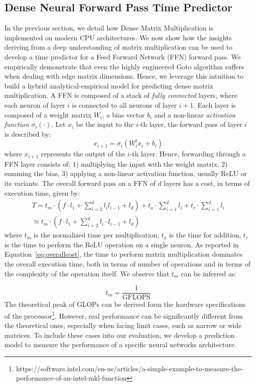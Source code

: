 \subsection{Dense Neural Forward Pass Time Predictor}
\label{subsec:densetimepred}
In the previous section, we detail how Dense Matrix Multiplication is implemented on modern CPU architectures. We now show how the insights deriving from a deep understanding of matrix multiplication can be used to develop a time predictor for a Feed Forward Network (FFN) forward pass. We empirically demonstrate that even the highly engineered Goto algorithm  suffers when dealing with edge matrix dimensions. Hence, we leverage this intuition to build a hybrid analytical-empirical model for predicting dense matrix multiplication.
A FFN is composed of a  stack of \textit{fully connected} layers, where each neuron of layer $i$ is connected to all neurons of layer $i+1$. Each layer is composed of a weight matrix $W_i$, a bias vector $b_i$ and a non-linear \textit{activation function} $\sigma_i( \cdot )$. Let $x_i$ be the input to the $i$-th layer, the forward pass of layer $i$ is described by:
\begin{equation}
	\label{eq:mlpforward}
	x_{i+1} = \sigma_i(W^t_i x_i + b_i)
\end{equation}
where $x_{i+1}$ represents the output of the $i$-th layer. 
Hence, forwarding through a FFN layer consists of: 1) multiplying the input with the weight matrix, 2) summing the bias, 3) applying a non-linear activation function, usually ReLU or its variants. The overall forward pass on a FFN of $d$ layers has a cost, in terms of execution time, given by:
\begin{align}
 \label{eq:overallcost}
 	T = t_m \cdot ( f \cdot l_1 + \sum_{i=2}^{d} l_i   l_{i-1} + l_{d})
 	 + t_a \cdot \sum_{i=1}^{d} l_i + t_r \cdot \sum_{i=1}^{d} l_i \nonumber \\
 	   \simeq t_m \cdot ( f \cdot l_1 + \sum_{i=2}^{d} l_i \cdot  l_{i-1} + l_d) 
 \end{align}
where $t_m $ is the normalized time per multiplication, $t_a$ is the time for addition, $t_r$ is the time to perform the ReLU operation on a single neuron. As reported in Equation~\ref{eq:overallcost}, the time to perform matrix multiplication dominates the overall execution time, both in terms of number of operations and in terms of the complexity of the operation itself. We observe that $t_m$ can be inferred as:

\begin{equation}
	\label{eq:tm}
	t_m = \frac{1}{\text{GFLOPS}}
\end{equation}
The theoretical peak of GLOPs can be derived form the hardware specifications of the processor\footnote{https://software.intel.com/en-us/articles/a-simple-example-to-measure-the-performance-of-an-intel-mkl-function}. However, real performance can be significantly different from the theoretical ones, especially when facing limit cases, such as narrow or wide matrices. To include these cases into our evaluation, we develop a prediction model to measure the performance of a specific neural networks architecture.

